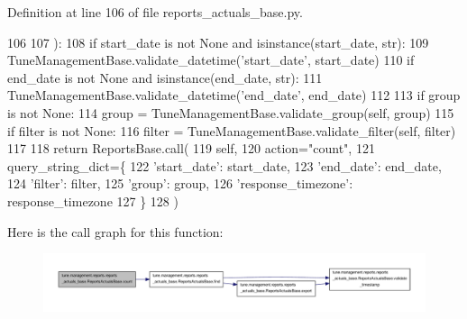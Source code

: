 Definition at line 106 of file reports\-\_\-actuals\-\_\-base.\-py.


\begin{DoxyCode}
106 
107     ):
108         \textcolor{keywordflow}{if} start\_date \textcolor{keywordflow}{is} \textcolor{keywordflow}{not} \textcolor{keywordtype}{None} \textcolor{keywordflow}{and} isinstance(start\_date, str):
109             TuneManagementBase.validate\_datetime(\textcolor{stringliteral}{'start\_date'}, start\_date)
110         \textcolor{keywordflow}{if} end\_date \textcolor{keywordflow}{is} \textcolor{keywordflow}{not} \textcolor{keywordtype}{None} \textcolor{keywordflow}{and} isinstance(end\_date, str):
111             TuneManagementBase.validate\_datetime(\textcolor{stringliteral}{'end\_date'}, end\_date)
112 
113         \textcolor{keywordflow}{if} group \textcolor{keywordflow}{is} \textcolor{keywordflow}{not} \textcolor{keywordtype}{None}:
114             group = TuneManagementBase.validate\_group(self, group)
115         \textcolor{keywordflow}{if} filter \textcolor{keywordflow}{is} \textcolor{keywordflow}{not} \textcolor{keywordtype}{None}:
116             filter = TuneManagementBase.validate\_filter(self, filter)
117 
118         \textcolor{keywordflow}{return} ReportsBase.call(
119             self,
120             action=\textcolor{stringliteral}{"count"},
121             query\_string\_dict=\{
122                 \textcolor{stringliteral}{'start\_date'}: start\_date,
123                 \textcolor{stringliteral}{'end\_date'}: end\_date,
124                 \textcolor{stringliteral}{'filter'}: filter,
125                 \textcolor{stringliteral}{'group'}: group,
126                 \textcolor{stringliteral}{'response\_timezone'}: response\_timezone
127             \}
128         )

\end{DoxyCode}


Here is the call graph for this function\-:
\nopagebreak
\begin{figure}[H]
\begin{center}
\leavevmode
\includegraphics[width=350pt]{classtune_1_1management_1_1reports_1_1reports__actuals__base_1_1ReportsActualsBase_a152cce9b560399e908b65d68bc057d3c_cgraph}
\end{center}
\end{figure}




